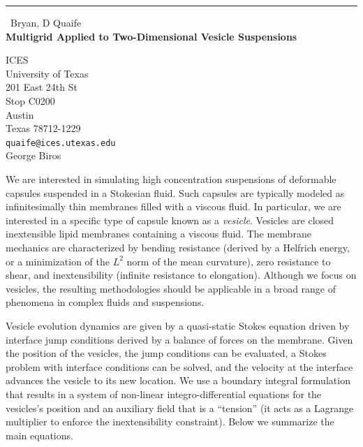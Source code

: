 \documentclass{report}
\begin{document}
\begin{center}
\rule{6in}{1pt} \
{\large Bryan, D Quaife \\
{\bf Multigrid Applied to Two-Dimensional Vesicle Suspensions}}

ICES \\ University of Texas \\ 201 East 24th St \\ Stop C0200 \\ Austin \\ Texas 78712-1229
\\
{\tt quaife@ices.utexas.edu}\\
George Biros\end{center}

\newcommand{\xx}{{\mathbf{x}}}
\newcommand{\yy}{{\mathbf{y}}}
\newcommand{\ff}{{\mathbf{f}}}
\renewcommand{\SS}{{\mathcal{S}}}
\newcommand{\RR}{{\mathbb{R}}}
\newcommand{\BB}{{\mathcal{B}}}
\newcommand{\DD}{{\mathcal{D}}}
\newcommand{\TT}{{\mathcal{T}}}
\newcommand{\LL}{{\mathcal{L}}}

We are interested in simulating high concentration suspensions of
deformable capsules suspended in a Stokesian fluid. Such capsules are
typically modeled as infinitesimally thin membranes filled with a viscous
fluid. In particular, we are interested in a specific type of capsule
known as a {\em vesicle}. Vesicles are closed inextensible lipid
membranes containing a viscous fluid. The membrane mechanics are
characterized by bending resistance (derived by a Helfrich energy, or a
minimization of the $L^2$ norm of the mean curvature), zero resistance to
shear, and inextensibility (infinite resistance to elongation). Although
we focus on vesicles, the resulting methodologies should be applicable in
a broad range of phenomena in complex fluids and suspensions.

Vesicle evolution dynamics are given by a quasi-static Stokes equation
driven by interface jump conditions derived by a balance of forces on the
membrane. Given the position of the vesicles, the jump conditions can be
evaluated, a Stokes problem with interface conditions can be solved, and
the velocity at the interface advances the vesicle to its new location.
We use a boundary integral formulation that results in a system of
non-linear integro-differential equations for the vesicles's position and
an auxiliary field that is a ``tension'' (it acts as a Lagrange
multiplier to enforce the inextensibility constraint). Below we summarize
the main equations.
\end{document}

